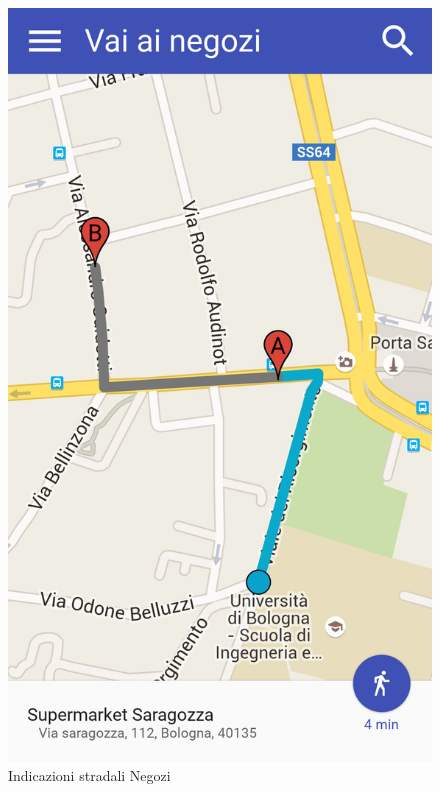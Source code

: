 \begin{figure}[H]
\begin{minipage}{.49\textwidth}
		\includegraphics[width=\textwidth]{img/wireframe/mappa.png}
		\caption{Indicazioni stradali Negozi}
	\end{minipage}
\end{figure}
